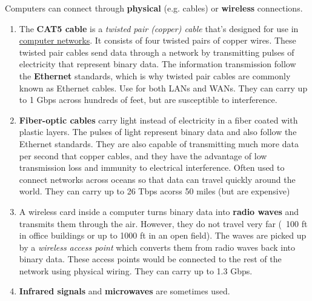 \documentclass{article}
\begin{document}
  Computers can connect through \textbf{physical} (e.g. cables) or \textbf{wireless} connections. 
  \begin{enumerate}
      \item The \textbf{CAT5 cable} is a \textit{twisted pair (copper) cable} that's designed for use in \hyperref[def:computer-network]{computer networks}. It consists of four twisted pairs of copper wires. These twisted pair cables send data through a network by transmitting pulses of electricity that represent binary data. The information transmission follow the \textbf{Ethernet} standards, which is why twisted pair cables are commonly known as Ethernet cables. Use for both LANs and WANs. They can carry up to 1 Gbps across hundreds of feet, but are susceptible to interference. 
      \item \textbf{Fiber-optic cables} carry light instead of electricity in a fiber coated with plastic layers. The pulses of light represent binary data and also follow the Ethernet standards. They are also capable of transmitting much more data per second that copper cables, and they have the advantage of low transmission loss and immunity to electrical interference. Often used to connect networks across oceans so that data can travel quickly around the world. They can carry up to 26 Tbps acorss 50 miles (but are expensive)
      \item A wireless card inside a computer turns binary data into \textbf{radio waves} and transmits them through the air. However, they do not travel very far (~100 ft in office buildings or up to 1000 ft in an open field). The waves are picked up by a \textit{wireless access point} which converts them from radio waves back into binary data. These access points would be connected to the rest of the network using physical wiring. They can carry up to 1.3 Gbps. 
      \item \textbf{Infrared signals} and \textbf{microwaves} are sometimes used. 
  \end{enumerate}
\end{document}
